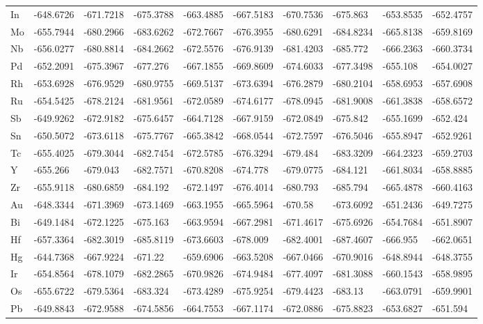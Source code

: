 \begin{table}[h]
{\begin{tabular}{*{10}{l}}
      In	& -648.6726	&-671.7218	&-675.3788	&-663.4885	&-667.5183	&-670.7536	&-675.863	  &-653.8535	&-652.4757 \\
      Mo	& -655.7944	&-680.2966	&-683.6262	&-672.7667	&-676.3955	&-680.6291	&-684.8234	&-665.8138	&-659.8169 \\
      Nb	& -656.0277	&-680.8814	&-684.2662	&-672.5576	&-676.9139	&-681.4203	&-685.772	  &-666.2363	&-660.3734 \\
      Pd	& -652.2091	&-675.3967	&-677.276	  &-667.1855	&-669.8609	&-674.6033	&-677.3498	&-655.108	  &-654.0027 \\
      Rh	& -653.6928	&-676.9529	&-680.9755	&-669.5137	&-673.6394	&-676.2879	&-680.2104	&-658.6953	&-657.6908 \\
      Ru	& -654.5425	&-678.2124	&-681.9561	&-672.0589	&-674.6177	&-678.0945	&-681.9008	&-661.3838	&-658.6572 \\
      Sb	& -649.9262	&-672.9182	&-675.6457	&-664.7128	&-667.9159	&-672.0849	&-675.842  	&-655.1699	&-652.424  \\
      Sn	& -650.5072	&-673.6118	&-675.7767	&-665.3842	&-668.0544	&-672.7597	&-676.5046	&-655.8947	&-652.9261 \\
      Tc	& -655.4025	&-679.3044	&-682.7454	&-672.5785	&-676.3294	&-679.484	  &-683.3209	&-664.2323	&-659.2703 \\
      Y	  & -655.266	&-679.043 	&-682.7571	&-670.8208	&-674.778	  &-679.0775	&-684.121	  &-661.8034	&-658.8885 \\
      Zr	& -655.9118	&-680.6859	&-684.192	  &-672.1497	&-676.4014	&-680.793	  &-685.794	  &-665.4878	&-660.4163 \\
      Au	& -648.3344	&-671.3969	&-673.1469	&-663.1955	&-665.5964	&-670.58		&-673.6092	&-651.2436	&-649.7275 \\
      Bi	& -649.1484	&-672.1225	&-675.163	  &-663.9594	&-667.2981	&-671.4617	&-675.6926	&-654.7684	&-651.8907 \\
      Hf	& -657.3364	&-682.3019	&-685.8119	&-673.6603	&-678.009	  &-682.4001	&-687.4607	&-666.955	  &-662.0651 \\
      Hg	& -644.7368	&-667.9224	&-671.22		&-659.6906	&-663.5208	&-667.0466	&-670.9016	&-648.8944	&-648.3755 \\
      Ir	& -654.8564	&-678.1079	&-682.2865	&-670.9826	&-674.9484	&-677.4097	&-681.3088	&-660.1543	&-658.9895 \\
      Os	& -655.6722	&-679.5364	&-683.324	  &-673.4289	&-675.9254	&-679.4423	&-683.13		&-663.0791	&-659.9901 \\
      Pb	& -649.8843	&-672.9588	&-674.5856	&-664.7553	&-667.1174	&-672.0886	&-675.8823	&-653.6827	&-651.594  \\

\end{tabular}}
\end{table}

